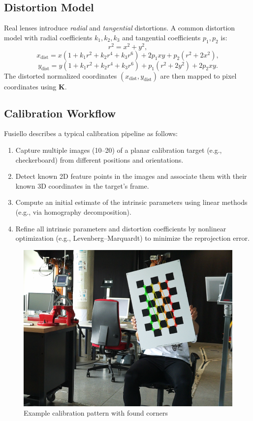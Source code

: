 \documentclass[english, bachelor, utf8]{base/thesis_telematics}
\begin{document}
\subsection*{Distortion Model}
Real lenses introduce \emph{radial} and \emph{tangential} distortions. A common distortion model with 
radial coefficients $k_1, k_2, k_3$ and tangential coefficients $p_1, p_2$ is:
\[
r^2 = x^2 + y^2,
\]
\[
x_{\mathrm{dist}} = x \left( 1 + k_1 r^2 + k_2 r^4 + k_3 r^6 \right) + 2 p_1 x y + p_2 (r^2 + 2 x^2),
\]
\[
y_{\mathrm{dist}} = y \left( 1 + k_1 r^2 + k_2 r^4 + k_3 r^6 \right) + p_1 (r^2 + 2 y^2) + 2 p_2 x y.
\]
The distorted normalized coordinates $(x_{\mathrm{dist}}, y_{\mathrm{dist}})$ are then mapped to pixel 
coordinates using $\mathbf{K}$.

\subsection*{Calibration Workflow}
Fusiello describes a typical calibration pipeline as follows:
\begin{enumerate}
    \item Capture multiple images (10--20) of a planar calibration target (e.g., checkerboard) from 
          different positions and orientations.
    \item Detect known 2D feature points in the images and associate them with their known 3D coordinates 
          in the target's frame.
    \item Compute an initial estimate of the intrinsic parameters using linear methods (e.g., via 
          homography decomposition).
    \item Refine all intrinsic parameters and distortion coefficients by nonlinear optimization (e.g., 
          Levenberg--Marquardt) to minimize the reprojection error.
\end{enumerate}

\begin{figure}[ht!]
    \centering
    \includegraphics[width=\linewidth]{pics/captured_chessboards/chessboard_005_annotated.png}
    \caption{Example calibration pattern with found corners}
    \label{fig:pattern}   
\end{figure}
\end{document}
